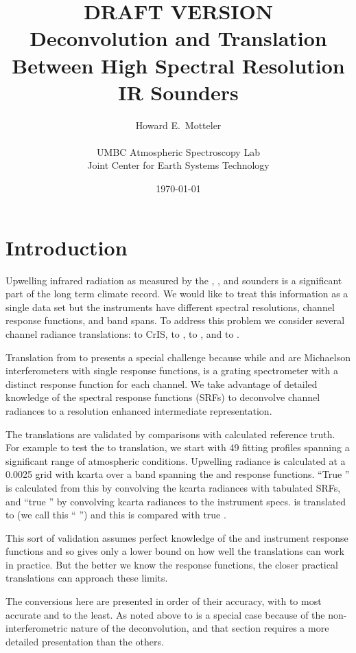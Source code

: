\documentclass[12pt]{article}
\title{DRAFT VERSION \\
  \vspace{5mm}
  Deconvolution and Translation \\
  Between High Spectral Resolution  \\
  IR Sounders \\
}
\author{Howard E.~Motteler \\
  \\
  UMBC Atmospheric Spectroscopy Lab \\
  Joint Center for Earth Systems Technology \\
}
\date{\today}
\begin{document}
\maketitle

\section{Introduction}

Upwelling infrared radiation as measured by the {\airs}, {\iasi},
and {\cris} sounders is a significant part of the long term climate
record.  We would like to treat this information as a single data
set but the instruments have different spectral resolutions, channel
response functions, and band spans.  To address this problem we
consider several channel radiance translations: {\iasi} to CrIS,
{\iasi} to {\airs}, {\cris} to {\airs}, and {\airs} to {\cris}.

Translation from {\airs} to {\cris} presents a special challenge
because while {\cris} and {\iasi} are Michaelson interferometers
with single response functions, {\airs} is a grating spectrometer
with a distinct response function for each channel.  We take
advantage of detailed knowledge of the {\airs} spectral response
functions (SRFs) to deconvolve {\airs} channel radiances to a
resolution enhanced intermediate representation.

The translations are validated by comparisons with calculated
reference truth.  For example to test the {\iasi} to {\airs}
translation, we start with 49 fitting profiles spanning a
significant range of atmospheric conditions.  Upwelling radiance is
calculated at a 0.0025 {\wn} grid with kcarta over a band spanning
the {\airs} and {\iasi} response functions.  ``True {\airs}'' is
calculated from this by convolving the kcarta radiances with
tabulated {\airs} SRFs, and ``true {\iasi}'' by convolving kcarta
radiances to the {\iasi} instrument specs.  {\iasi} is translated to
{\airs} (we call this ``{\iasi} {\airs}'') and this is compared with
true {\airs}.

This sort of validation assumes perfect knowledge of the {\airs} 
and {\iasi} instrument response functions and so gives only a lower
bound on how well the translations can work in practice.  But the
better we know the response functions, the closer practical
translations can approach these limits.

The conversions here are presented in order of their accuracy, with
{\iasi} to {\cris} most accurate and {\cris} to {\airs} the least.
As noted above {\airs} to {\cris} is a special case because of the
non-interferometric nature of the deconvolution, and that section
requires a more detailed presentation than the others.
\end{document}
